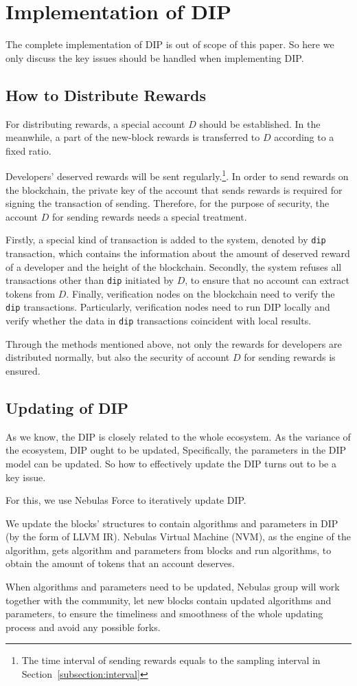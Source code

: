 \section{Implementation of DIP}
\noindent
The complete implementation of DIP is out of scope of this paper. So here we only discuss the key issues should be handled when implementing DIP\@.

\subsection{How to Distribute Rewards}
\noindent
For distributing rewards, a special account $D$ should be established. In the meanwhile, a part of the new-block rewards is transferred to $D$ according to a fixed ratio.

Developers' deserved rewards will be sent regularly.\footnote{The time interval of sending rewards equals to the sampling interval in Section~\ref{subsection:interval}}. In order to send rewards on the blockchain, the private key of the account that sends rewards is required for signing the transaction of sending. Therefore, for the purpose of security, the account $D$ for sending rewards needs a special treatment.

Firstly, a special kind of transaction is added to the system, denoted by \texttt{dip} transaction, which contains the information about the amount of deserved reward of a developer and the height of the blockchain. Secondly, the system refuses all transactions other than \texttt{dip} initiated by $D$, to ensure that no account can extract tokens from $D$. Finally, verification nodes on the blockchain  need to verify the \texttt{dip} transactions. Particularly, verification nodes need to run DIP locally and verify whether the data in \texttt{dip} transactions coincident with local results.

Through the methods mentioned above, not only the rewards for developers are distributed normally, but also the security of account $D$ for sending rewards is ensured.

\subsection{Updating of DIP}
\noindent
As we know, the DIP is closely related to the whole ecosystem. As the variance of the ecosystem, DIP ought to be updated, Specifically, the parameters in the DIP model can be updated. So how to effectively update the DIP turns out to be a key issue.

For this, we use Nebulas Force to iteratively update DIP\@.

We update the blocks' structures to contain algorithms and parameters in DIP (by the form of LLVM IR). Nebulas Virtual Machine (NVM), as the engine of the algorithm, gets algorithm and parameters from blocks and run algorithms, to obtain the amount of tokens that an account deserves.

When algorithms and parameters need to be updated, Nebulas group will work together with the community, let new blocks contain updated algorithms and parameters, to ensure the timeliness and smoothness of the whole updating process and avoid any possible forks.
